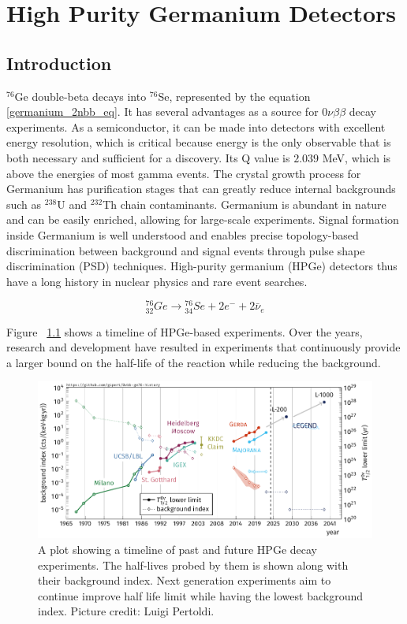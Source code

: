 \chapter{High Purity Germanium Detectors}
\label{chap:detectors}

\section{Introduction}
${}^{76}$Ge double-beta decays into ${}^{76}$Se, represented by the equation \ref{germanium_2nbb_eq}. It has several advantages as a source for $0\nu\beta\beta$ decay experiments. As a semiconductor, it can be made into detectors with excellent energy resolution, which is critical because energy is the only observable that is both necessary and sufficient for a discovery. Its Q value is $2.039$ MeV, which is above the energies of most gamma events. The crystal growth process for Germanium has purification stages that can greatly reduce internal backgrounds such as $^{238}$U and $^{232}$Th chain contaminants. Germanium is abundant in nature and can be easily enriched, allowing for large-scale experiments. Signal formation inside Germanium is well understood and enables precise topology-based discrimination between background and signal events through pulse shape discrimination (PSD) techniques. High-purity germanium (HPGe) detectors thus have a long history in nuclear physics and rare event searches.


\begin{equation}\label{germanium_2nbb_eq}
{}_{32}^{76}Ge \rightarrow {}_{34}^{76}Se + 2e^- + 2\bar{\nu}_e
\end{equation}

Figure ~\ref{past_ge_exp} shows a timeline of HPGe-based experiments. Over the years, research and development have resulted in experiments that continuously provide a larger bound on the half-life of the reaction while reducing the background. 

\begin{figure}[!htb]
\centering
\includegraphics[trim=0.1cm 0 0.1cm 0,clip, width=0.99\linewidth]{ch2/figs/0nbb-ge76-history-future.pdf}
\caption{A plot showing a timeline of past and future HPGe {\onbb} decay experiments. The half-lives probed by them is shown along with their background index. Next generation experiments aim to continue improve half life limit while having the lowest background index. Picture credit: Luigi Pertoldi.}
\label{past_ge_exp}
\end{figure}


